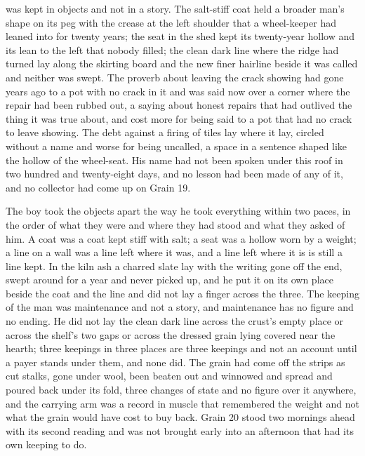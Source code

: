  was kept in objects and not in a story. The salt-stiff coat held a broader man's shape on its peg with the crease at the left shoulder that a wheel-keeper had leaned into for twenty years; the seat in the shed kept its twenty-year hollow and its lean to the left that nobody filled; the clean dark line where the  ridge had turned lay along the skirting board and the new finer hairline beside it was called  and neither was swept. The proverb about leaving the crack showing had gone years ago to a pot with no crack in it and was said now over a corner where the repair had been rubbed out, a saying about honest repairs that had outlived the thing it was true about, and cost more for being said to a pot that had no crack to leave showing. The debt against a firing of tiles lay where it lay, circled without a name and worse for being uncalled, a space in a sentence shaped like the hollow of the wheel-seat. His name had not been spoken under this roof in two hundred and twenty-eight days, and no lesson had been made of any of it, and no collector had come up  on Grain 19.

The boy took the objects apart the way he took everything within two paces, in the order of what they were and where they had stood and what they asked of him. A coat was a coat kept stiff with salt; a seat was a hollow worn by a weight; a line on a wall was a line left where it was, and a line left where it is is still a line kept. In the kiln ash a charred slate lay with the writing gone off the end, swept around for a year and never picked up, and he put it on its own place beside the coat and the line and did not lay a finger across the three. The keeping of the man was maintenance and not a story, and maintenance has no figure and no ending. He did not lay the clean dark line across the crust's empty place or across the shelf's two gaps or across the dressed grain lying covered near the hearth; three keepings in three places are three keepings and not an account until a payer stands under them, and none did. The grain had come off the strips as cut stalks, gone under wool, been beaten out and winnowed and spread and poured back under its fold, three changes of state and no figure over it anywhere, and the carrying arm was a record in muscle that remembered the weight and not what the grain would have cost to buy back. Grain 20 stood two mornings ahead with its second reading and was not brought early into an afternoon that had its own keeping to do.

